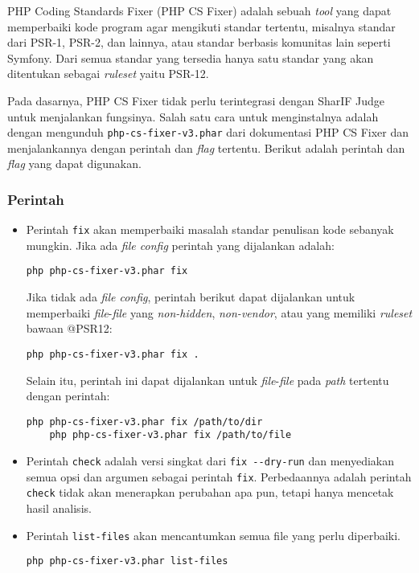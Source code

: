 PHP Coding Standards Fixer (PHP CS Fixer) \cite{PHP_CS_Fixer} adalah sebuah \textit{tool} yang dapat memperbaiki kode program agar mengikuti standar tertentu, misalnya standar dari PSR-1, PSR-2, dan lainnya, atau standar berbasis komunitas lain seperti Symfony. Dari semua standar yang tersedia hanya satu standar yang akan ditentukan sebagai \textit{ruleset} yaitu PSR-12. 

Pada dasarnya, PHP CS Fixer tidak perlu terintegrasi dengan SharIF Judge untuk menjalankan fungsinya. Salah satu cara untuk menginstalnya adalah dengan mengunduh \verb|php-cs-fixer-v3.phar| dari dokumentasi PHP CS Fixer dan menjalankannya dengan perintah dan \textit{flag} tertentu. Berikut adalah perintah dan \textit{flag} yang dapat digunakan.
\subsubsection{Perintah} 
	\begin{itemize}
		\item Perintah \verb|fix| akan memperbaiki masalah standar penulisan kode sebanyak mungkin. Jika ada \textit{file config} perintah yang dijalankan adalah:
		 \begin{lstlisting}[basicstyle=\ttfamily, frame=single,
		 	columns=fullflexible, keepspaces=true, breaklines=true, label=ls:1]
		 	php php-cs-fixer-v3.phar fix 
		 \end{lstlisting}
	 	Jika tidak ada \textit{file config}, perintah berikut dapat dijalankan untuk memperbaiki \textit{file}-\textit{file} yang \textit{non-hidden}, \textit{non-vendor}, atau yang memiliki \textit{ruleset} bawaan @PSR12:
	 	\begin{lstlisting}[basicstyle=\ttfamily, frame=single,
	 	columns=fullflexible, keepspaces=true, breaklines=true, label=ls:1]
	 	php php-cs-fixer-v3.phar fix .
	 	\end{lstlisting}
 		Selain itu, perintah ini dapat dijalankan untuk \textit{file}-\textit{file} pada \textit{path} tertentu dengan perintah:
		 \begin{lstlisting}[basicstyle=\ttfamily, frame=single,
 	columns=fullflexible, keepspaces=true, breaklines=true, label=ls:1]
 	php php-cs-fixer-v3.phar fix /path/to/dir
 	php php-cs-fixer-v3.phar fix /path/to/file
 		\end{lstlisting}

	\item Perintah \verb|check| adalah versi singkat dari \verb|fix --dry-run| dan menyediakan semua opsi dan argumen sebagai perintah \verb|fix|. Perbedaannya adalah perintah \verb|check| tidak akan menerapkan perubahan apa pun, tetapi hanya mencetak hasil analisis.
	
	\item Perintah \verb|list-files| akan mencantumkan semua file yang perlu diperbaiki.
	 \begin{lstlisting}[basicstyle=\ttfamily, frame=single,
		columns=fullflexible, keepspaces=true, breaklines=true, label=ls:1]
		php php-cs-fixer-v3.phar list-files
	\end{lstlisting}
	\end{itemize}

